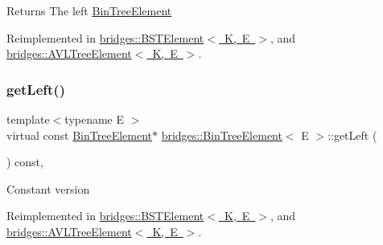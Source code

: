\begin{DoxyReturn}{Returns}
The left \mbox{\hyperlink{classbridges_1_1_bin_tree_element}{Bin\+Tree\+Element}} 
\end{DoxyReturn}


Reimplemented in \mbox{\hyperlink{classbridges_1_1_b_s_t_element_a4d8987373c75b51fca94e3c0b78b87a6}{bridges\+::\+B\+S\+T\+Element$<$ K, E $>$}}, and \mbox{\hyperlink{classbridges_1_1_a_v_l_tree_element_a7b5d05660da127f5f6164120d9846d90}{bridges\+::\+A\+V\+L\+Tree\+Element$<$ K, E $>$}}.

\mbox{\label{classbridges_1_1_bin_tree_element_a0841701bd7d4b444dafbbdfefed067a5}} 
\subsubsection{\texorpdfstring{get\+Left()}{getLeft()}\hspace{0.1cm}{\footnotesize\ttfamily [2/2]}}
{\footnotesize\ttfamily template$<$typename E $>$ \\
virtual const \mbox{\hyperlink{classbridges_1_1_bin_tree_element}{Bin\+Tree\+Element}}$\ast$ \mbox{\hyperlink{classbridges_1_1_bin_tree_element}{bridges\+::\+Bin\+Tree\+Element}}$<$ E $>$\+::get\+Left (\begin{DoxyParamCaption}{ }\end{DoxyParamCaption}) const\hspace{0.3cm}{\ttfamily [inline]}, {\ttfamily [virtual]}}

Constant version 

Reimplemented in \mbox{\hyperlink{classbridges_1_1_b_s_t_element_a2abcfb991f6cc377da2bd9217319fc9c}{bridges\+::\+B\+S\+T\+Element$<$ K, E $>$}}, and \mbox{\hyperlink{classbridges_1_1_a_v_l_tree_element_a61e075db5414b7bd6f52d657401acda3}{bridges\+::\+A\+V\+L\+Tree\+Element$<$ K, E $>$}}.

\mbox{\label{classbridges_1_1_bin_tree_element_a5751f2fe38e2364f68dc37939fce060f}} 
